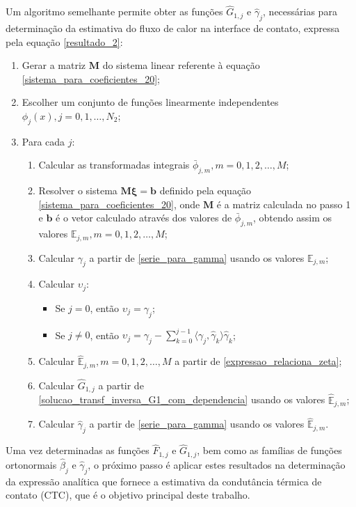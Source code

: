Um algoritmo semelhante permite obter as funções $\hat{G}_{1,j}$ e $\hat{\gamma}_j$, necessárias para determinação da estimativa do fluxo de calor na interface de contato, expressa pela equação \eqref{resultado_2}:
\begin{enumerate}
	\item Gerar a matriz $\mathbf{M}$ do sistema linear referente à equação \eqref{sistema_para_coeficientes_20};
	\item Escolher um conjunto de funções linearmente independentes $\phi_j(x), j=0,1,\ldots,N_2$;
	\item Para cada $j$:
	\begin{enumerate}	
		\item Calcular as transformadas integrais $\bar{\phi}_{j,m}, m=0,1,2, \ldots, M$;
		\item Resolver o sistema $\mathbf{M}\mathbf{\xi} = \mathbf{b}$ definido pela equação \eqref{sistema_para_coeficientes_20}, onde $\mathbf{M}$ é a matriz calculada no passo 1 e $\mathbf{b}$ é o vetor calculado através dos valores de $\bar{\phi}_{j,m}$, obtendo assim os valores $\mathbb{E}_{j,m}, m=0,1,2, \ldots, M$;
		\item Calcular $\gamma_j$ a partir de \eqref{serie_para_gamma} usando os valores $\mathbb{E}_{j,m}$;
		\item Calcular $\upsilon_j$:
		\begin{itemize}
			\item Se $j = 0$, então $\upsilon_j = \gamma_j$;
			\item Se $j \ne 0$, então $\upsilon_j = \gamma_j - \displaystyle\sum_{k = 0}^{j - 1} \langle \gamma_j, \hat{\gamma}_k\rangle\hat{\gamma}_k$;
		\end{itemize}
		\item Calcular $\hat{\mathbb{E}}_{j,m}, m=0,1,2, \ldots, M$ a partir de \eqref{expressao_relaciona_zeta};
		\item Calcular $\hat{G}_{1,j}$ a partir de \eqref{solucao_transf_inversa_G1_com_dependencia} usando os valores $\hat{\mathbb{E}}_{j,m}$;
		\item Calcular $\hat{\gamma}_j$ a partir de \eqref{serie_para_gamma} usando os valores $\hat{\mathbb{E}}_{j,m}$.
	\end{enumerate}
\end{enumerate}

Uma vez determinadas as funções $\hat{F}_{1,j}$ e $\hat{G}_{1,j}$, bem como as famílias de funções ortonormais $\hat{\beta}_j$ e $\hat{\gamma}_j$, o próximo passo é aplicar estes resultados na determinação da expressão analítica que fornece a estimativa da condutância térmica de contato (CTC), que é o objetivo principal deste trabalho.